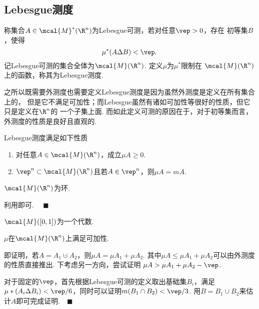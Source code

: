 \subsection{Lebesgue测度}
  \begin{defi}[Lebesgue测度]
    称集合$A\in\mcal{M}^*(\R^n)$为Lebesgue可测，若对任意$\vep>0$，存在
    初等集$B$，使得
    \begin{equation}
      \label{equ: Lebesgue测度}
      \mu^*(A\Delta B) < \vep.
    \end{equation}
    记Lebesgue可测的集合全体为$\mcal{M}(\R^n)$. 定义$\mu$为$\mu^*$限制在
    $\mcal{M}(\R^n)$上的函数，称其为Lebesgue测度.
  \end{defi}
  \remark
    之所以既需要外测度也需要定义Lebesgue测度是因为虽然外测度是定义在所有集合上的，
    但是它不满足可加性；而Lebesgue虽然有诸如可加性等很好的性质，但它只是定义在$\R^n$的
    一个子集上面. 而如此定义可测的原因在于，对于初等集而言，外测度的性质是良好且直观的.

  \begin{pos}[Lebesgue测度的性质]
    Lebesgue测度满足如下性质
    \begin{enumerate}
      \item 对任意$A\in\mcal{M}(\R^n)$，成立$\mu A\ge 0$.
      \item $\vep^n\subset\mcal{M}(\R^n)$且若$A\in\vep^n$，则$\mu A=m A$.
    \end{enumerate}
  \end{pos}

  \begin{thm}
    $\mcal{M}(\R^n)$为环.
  \end{thm}
  \proof
    利用即可. $\quad\blacksquare$

  \begin{cor}
    $\mcal{M}([0, 1])$为一个代数.
  \end{cor}

  \begin{thm}
    $\mu$在$\mcal{M}(\R^n)$上满足可加性.
  \end{thm}
  \proof
    即证明，若$A=A_1\cupdot A_2$，则$\mu A = \mu A_1 + \mu A_2$. 其中$\mu A
    \le \mu A_1 + \mu A_2$可以由外测度的性质直接推出. 下考虑另一方向，尝试证明
    $\mu A > \mu A_1 + \mu A_2 - \vep$.\par
    对于固定的$\vep$，首先根据Lebesgue可测的定义取出基础集$B_i$，满足$\mu*(A_i
    \Delta B_i)<\vep/6$，同时可以证明$m(B_1\cap B_2)<\vep/3$. 用$B=B_1\cup
    B_2$来估计$A$即可完成证明.$\quad\blacksquare$

